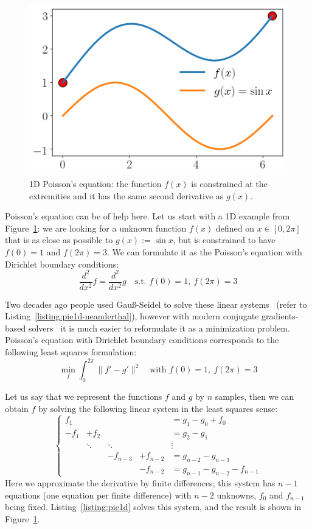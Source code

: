\documentclass[notitlepage,oneside]{book}
\begin{document}
\begin{figure}[!b]
    \centering
    \includegraphics[width=.34\linewidth]{img/pie-1d.png}
    \caption{1D Poisson's equation: the function $f(x)$ is constrained at the extremities and it has the same second derivative as $g(x)$.}
    \label{fig:pie1d}
\end{figure}

Poisson's equation can be of help here. Let us start with a 1D example from Figure~\ref{fig:pie1d}: we are looking for a unknown function $f(x)$ defined on $x\in[0,2\pi]$ that is as close as possible to $g(x):=\sin x$, but is constrained to have $f(0)=1$ and $f(2\pi) = 3$.
We can formulate it as the Poisson's equation with Dirichlet boundary conditions:
\begin{equation}
\frac{d^2}{dx^2}f  = \frac{d^2}{dx^2} g \quad \text{s.t.~} f(0)=1,~f(2\pi) = 3
\label{eq:poisson}
\end{equation}

Two decades ago people used Gauß-Seidel to solve these linear systems~\cite{10.1145/882262.882269} (refer to Listing~\ref{listing:pie1d-neanderthal}),
however with modern conjugate gradients-based solvers~\cite{OpenNL} it is much easier to reformulate it as a minimization problem.
Poisson's equation with Dirichlet boundary conditions corresponds to the following least squares formulation:
$$
\min\limits_{f} \int_0^{2\pi} \|f' - g'\|^2 \quad \text{with~} f(0)=1,~f(2\pi) = 3
$$

Let us say that we represent the functions $f$ and $g$ by $n$ samples, then we can obtain $f$ by solving the following linear system in the least squares sense:
\begin{equation}
\label{eq:pie1d}
\left \{ \begin{array}{ccccl}
{f_1} &       &       &           & =  g_1 - g_0 + {f_0}  \\
-{f_1} & + {f_2} &       &           & = g_2 - g_1 \\
    &  \ddots     & \ddots      &     &       \vdots      \\
     &        &  -{f_{n-3}}     &  +{f_{n-2}}          & = g_{n-2} - g_{n-3} \\
     &        &       & - {f_{n-2}} & =  g_{n-1}-g_{n-2} -{f_{n-1}}
\end{array} \right.
\end{equation}
Here we approximate the derivative by finite differences;
this system has $n-1$ equations (one equation per finite difference) with $n-2$ unknowns, $f_0$ and $f_{n-1}$ being fixed.
Listing~\ref{listing:pie1d} solves this system, and the result is shown in  Figure~\ref{fig:pie1d}.
\end{document}
